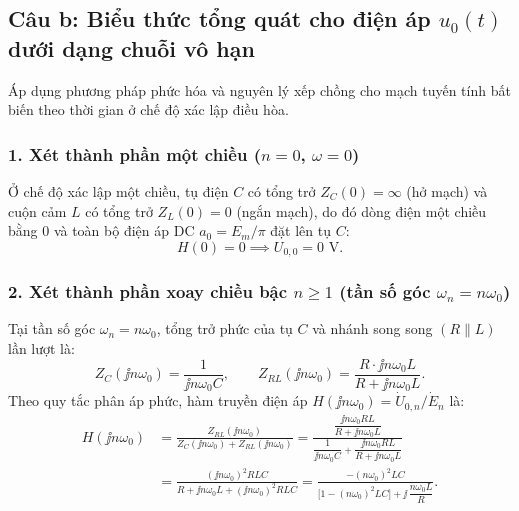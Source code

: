 \subsection{Câu b: Biểu thức tổng quát cho điện áp \texorpdfstring{$u_0(t)$}{u0(t)} dưới dạng chuỗi vô hạn}

Áp dụng phương pháp phức hóa và nguyên lý xếp chồng cho mạch tuyến tính bất biến theo thời gian ở chế độ xác lập điều hòa.

\subsubsection*{1. Xét thành phần một chiều ($n = 0$, $\omega = 0$)}
Ở chế độ xác lập một chiều, tụ điện $C$ có tổng trở $Z_C(0) = \infty$ (hở mạch) và cuộn cảm $L$ có tổng trở $Z_L(0) = 0$ (ngắn mạch), do đó dòng điện một chiều bằng $0$ và toàn bộ điện áp DC $a_0 = E_m/\pi$ đặt lên tụ $C$:
\begin{equation}
    H(0) = 0 \implies U_{0,0} = 0\text{ V}.
\end{equation}

\subsubsection*{2. Xét thành phần xoay chiều bậc $n \ge 1$ (tần số góc $\omega_n = n\omega_0$)}
Tại tần số góc $\omega_n = n\omega_0$, tổng trở phức của tụ $C$ và nhánh song song $(R \parallel L)$ lần lượt là:
\begin{equation}
    Z_C(\jj n\omega_0) = \frac{1}{\jj n\omega_0 C}, \qquad
    Z_{RL}(\jj n\omega_0) = \frac{R \cdot \jj n\omega_0 L}{R + \jj n\omega_0 L}.
\end{equation}
Theo quy tắc phân áp phức, hàm truyền điện áp $H(\jj n\omega_0) = \dot{U}_{0,n}/\dot{E}_n$ là:
\begin{align}
    H(\jj n\omega_0)
    &= \frac{Z_{RL}(\jj n\omega_0)}{Z_C(\jj n\omega_0) + Z_{RL}(\jj n\omega_0)}
     = \frac{\dfrac{\jj n\omega_0 RL}{R + \jj n\omega_0 L}}{\dfrac{1}{\jj n\omega_0 C} + \dfrac{\jj n\omega_0 RL}{R + \jj n\omega_0 L}} \nonumber\\
    &= \frac{(\jj n\omega_0)^2 RLC}{R + \jj n\omega_0 L + (\jj n\omega_0)^2 RLC}
     = \frac{-(n\omega_0)^2 LC}{\Big[1 - (n\omega_0)^2 LC\Big] + \jj\,\dfrac{n\omega_0 L}{R}}.
    \label{eq:transfer_H}
\end{align}

